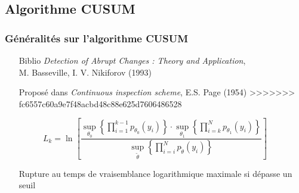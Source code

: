 \documentclass{beamer}
\begin{document}

\subsection{Algorithme CUSUM}

\begin{frame}
	\frametitle{Généralités sur l'algorithme CUSUM}
	\begin{itemize}
		\item[Biblio] \emph{Detection of Abrupt Changes : Theory and Application},\\
		M. Basseville, I. V. Nikiforov (1993)
		\item[Proposé] dans \emph{Continuous inspection scheme}, E.S. Page (1954)
>>>>>>> fc6557c60a9e7f48acbd48c88e625d7606486528
	\end{itemize}

\vspace{-.4cm}
	\begin{equation}
		L _k =\ln \left[ \frac{\sup_{\theta_0}\left\{ \prod_{i=1}^{k-1} p_{\theta_0}(y_i) \right\} \cdot \sup_{\theta_1} \left\{ \prod_{i = k}^{N}p_{\theta_1}(y_i) \right\}}{\sup_{\tilde\theta}\left\{\prod_{i=i}^{N}p_{\tilde{\theta}}(y_i)\right\}} \right]
	\end{equation}
\phantom{caca}

	\begin{itemize}
		\item[Rupture] au temps de vraisemblance logarithmique maximale si dépasse un seuil
	\end{itemize}


\end{frame}
\end{document}
\end{frame}
\end{document}
